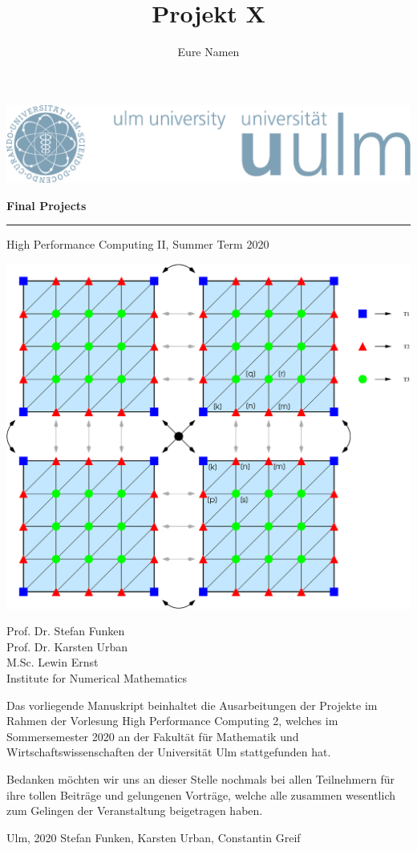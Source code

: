 \documentclass[paper=a4,11pt,oneside]{article}
\theoremstyle{definition}
\theoremstyle{definition}
\theoremstyle{definition}
\theoremstyle{definition}
\theoremstyle{definition}
\theoremstyle{definition}
\theoremstyle{definition}
\theoremstyle{remark}
\theoremstyle{definition}
\begin{document}
\thispagestyle{empty}
\begin{flushright}
  \includegraphics[width=0.5\linewidth]{Grafiken/UniLogo.pdf}
\vspace*{50pt}

  \begin{LARGE}

    \textbf{\sc Final Projects} \\
    \rule{340pt}{1.5pt}

\end{LARGE}
\begin{Large}
High Performance Computing II, Summer Term 2020
\end{Large}

\vspace*{70pt}

\begin{center}
 \includegraphics[width=0.4 \linewidth]{Grafiken/decomp.eps}
\end{center}

\vspace*{80pt}

Prof. Dr. Stefan Funken  \\
Prof. Dr. Karsten Urban\\
M.Sc. Lewin Ernst \\
  \vspace{8pt}
  Institute for Numerical Mathematics
  
\newpage
\vspace{-2cm}
Das vorliegende Manuskript beinhaltet die Ausarbeitungen der
Projekte im Rahmen der Vorlesung High Performance Computing 2, 
welches im Sommersemester 2020 an der Fakult\"at f\"ur 
Mathematik und Wirtschaftswissenschaften der Universit\"at Ulm 
stattgefunden hat.

\medskip

Bedanken m\"ochten wir uns an dieser Stelle nochmals bei allen Teilnehmern f\"ur
ihre tollen Beitr\"age und gelungenen Vortr\"age, welche alle zusammen wesentlich 
zum Gelingen der Veranstaltung beigetragen haben.

\bigskip
\bigskip

Ulm, 2020 \hfill  Stefan Funken, Karsten Urban, Constantin Greif

  
  
  
 

\end{flushright}
\thispagestyle{empty} 

\newpage
\title{Projekt X}
\author{Eure Namen}
\thispagestyle{empty} 

\maketitle
\tableofcontents



\end{document}
